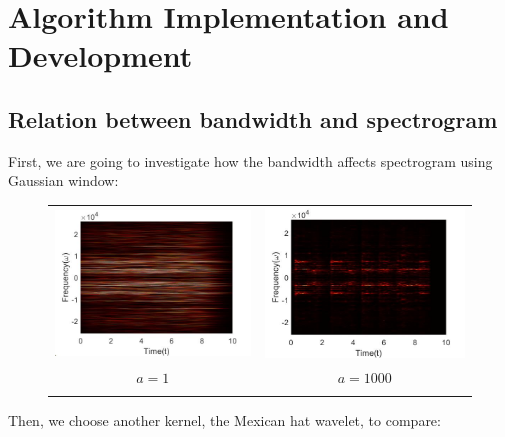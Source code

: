 \documentclass[12pt]{article}
\begin{document}
\section{Algorithm Implementation and Development}
\subsection{Relation between bandwidth and spectrogram}
First, we are going to investigate how the bandwidth affects spectrogram using Gaussian window:

\begin{figure}[H]
\begin{tabular}{cc}
  \includegraphics[width=65mm]{s1.jpg} &    \includegraphics[width=65mm]{s4.jpg} \\
 $a=1$ &  $a=1000$ \\[6pt]\\
\end{tabular}
\end{figure}
Then, we choose another kernel, the Mexican hat wavelet, to compare:
\end{document}
